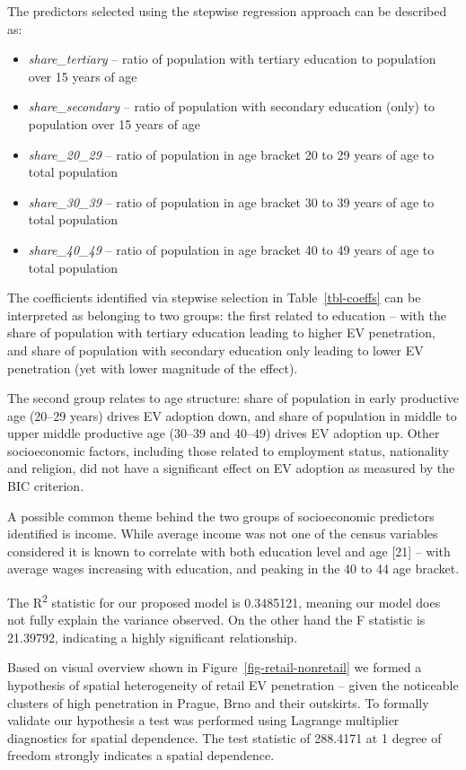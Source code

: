 \documentclass{mmeproc}
\begin{document}
The predictors selected using the stepwise regression approach can be
described as:

\begin{itemize}
\item
  \emph{share\_tertiary} -- ratio of population with tertiary education
  to population over 15 years of age
\item
  \emph{share\_secondary} -- ratio of population with secondary
  education (only) to population over 15 years of age
\item
  \emph{share\_20\_29} -- ratio of population in age bracket 20 to 29
  years of age to total population
\item
  \emph{share\_30\_39} -- ratio of population in age bracket 30 to 39
  years of age to total population
\item
  \emph{share\_40\_49} -- ratio of population in age bracket 40 to 49
  years of age to total population
\end{itemize}

The coefficients identified via stepwise selection in
Table~\ref{tbl-coeffs} can be interpreted as belonging to two groups:
the first related to education -- with the share of population with
tertiary education leading to higher EV penetration, and share of
population with secondary education only leading to lower EV penetration
(yet with lower magnitude of the effect).

The second group relates to age structure: share of population in early
productive age (20--29 years) drives EV adoption down, and share of
population in middle to upper middle productive age (30--39 and 40--49)
drives EV adoption up. Other socioeconomic factors, including those
related to employment status, nationality and religion, did not have a
significant effect on EV adoption as measured by the BIC criterion.

A possible common theme behind the two groups of socioeconomic
predictors identified is income. While average income was not one of the
census variables considered it is known to correlate with both education
level and age {[}21{]} -- with average wages increasing with education,
and peaking in the 40 to 44 age bracket.

The R\textsuperscript{2} statistic for our proposed model is 0.3485121,
meaning our model does not fully explain the variance observed. On the
other hand the F statistic is 21.39792, indicating a highly significant
relationship.

Based on visual overview shown in Figure~\ref{fig-retail-nonretail} we
formed a hypothesis of spatial heterogeneity of retail EV penetration --
given the noticeable clusters of high penetration in Prague, Brno and
their outskirts. To formally validate our hypothesis a test was
performed using Lagrange multiplier diagnostics for spatial dependence.
The test statistic of 288.4171 at 1 degree of freedom strongly indicates
a spatial dependence.
\end{document}
